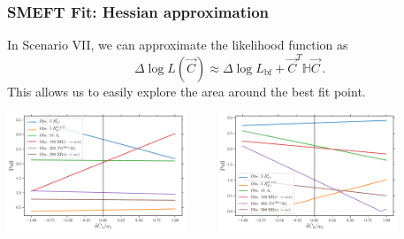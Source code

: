 \documentclass[mathserif, 10pt]{beamer}
\begin{document}
\begin{frame}\frametitle{SMEFT Fit: Hessian approximation}

    In Scenario VII, we can approximate the likelihood function as
    $$\Delta\log L (\vec{C}) \approx \Delta\log L_\mathrm{bf} + \vec{C}^T \mathbb{H} \vec{C}\,.$$
    This allows us to easily explore the area around the best fit point.

    \begin{center}
        \includegraphics[width=0.4\textwidth]{figures/evo_ax1.pdf} $\qquad$
        \includegraphics[width=0.4\textwidth]{figures/evo_ax3.pdf}
    \end{center}
\end{frame}
\end{document}
